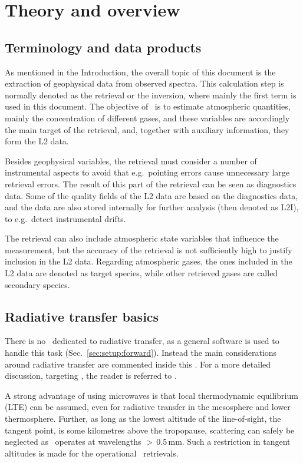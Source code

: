 \chapter{Theory and overview}
\label{chapter:overview}


\section{Terminology and data products}
\label{sec:terminology}
%
As mentioned in the Introduction, the overall topic of this document is the
extraction of geophysical data from observed spectra. This calculation step is
normally denoted as the retrieval or the inversion, where mainly the first term
is used in this document. The objective of \smr\ is to estimate atmospheric
quantities, mainly the concentration of different gases, and these variables
are accordingly the main target of the retrieval, and, together with auxiliary
information, they form the L2 data. 

Besides geophysical variables, the retrieval must consider a number of
instrumental aspects to avoid that e.g.\ pointing errors cause unnecessary
large retrieval errors. The result of this part of the retrieval can be seen as
diagnostics data. Some of the quality fields of the L2 data are based on the
diagnostics data, and the data are also stored internally for further analysis
(then denoted as L2I), to e.g.\ detect instrumental drifts.

The retrieval can also include atmospheric state variables that influence the
measurement, but the accuracy of the retrieval is not sufficiently high to
justify inclusion in the L2 data. Regarding atmospheric gases, the ones
included in the L2 data are denoted as target species, while other retrieved
gases are called secondary species.



\section{Radiative transfer basics}
\label{sec:rt}
%
There is no \ATBD\ dedicated to radiative transfer, as a general software is used
to handle this task (Sec.~\ref{sec:setup:forward}). Instead the main
considerations around radiative transfer are commented inside this \ATBD. For a
more detailed discussion, targeting \smr, the reader is referred to
\citet{eriksson:studi:02}.

A strong advantage of using microwaves is that local thermodynamic equilibrium
(LTE) can be assumed, even for radiative transfer in the mesosphere and lower
thermosphere. Further, as long as the lowest altitude of the line-of-sight, the
tangent point, is some kilometres above the tropopause, scattering can safely
be neglected as \smr\ operates at wavelengths $>$\,0.5\,mm. Such a restriction in
tangent altitudes is made for the operational \smr\ retrievals. 

